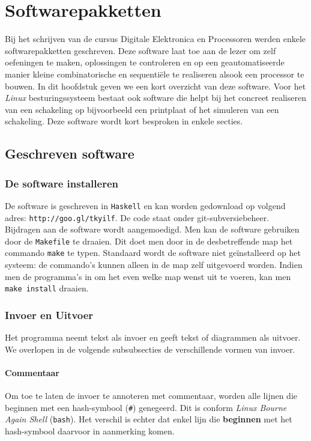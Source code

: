 \chapter{Softwarepakketten}
\begin{chapterintro}
Bij het schrijven van de cursus Digitale Elektronica en Processoren werden enkele softwarepakketten geschreven. Deze software laat toe aan de lezer om zelf oefeningen te maken, oplossingen te controleren en op een geautomatiseerde manier kleine combinatorische en sequenti\"ele te realiseren alsook een processor te bouwen. In dit hoofdstuk geven we een kort overzicht van deze software. Voor het \emph{Linux} besturingssysteem bestaat ook software die helpt bij het concreet realiseren van een schakeling op bijvoorbeeld een printplaat of het simuleren van een schakeling. Deze software wordt kort besproken in enkele secties.
\end{chapterintro}
\minitoc[n]
\section{Geschreven software}
\subsection{De software installeren}
De software is geschreven in \texttt{Haskell} en kan worden gedownload op volgend adres: \texttt{http://goo.gl/tkyilf}. De code staat onder git-subversiebeheer. Bijdragen aan de software wordt aangemoedigd. Men kan de software gebruiken door de \texttt{Makefile} te draaien. Dit doet men door in de desbetreffende map het commando \texttt{make} te typen. Standaard wordt de software niet ge\"installeerd op het systeem: de commando's kunnen alleen in de map zelf uitgevoerd worden. Indien men de programma's in om het even welke map wenst uit te voeren, kan men \texttt{make install} draaien.
\subsection{Invoer en Uitvoer}
Het programma neemt tekst als invoer en geeft tekst of diagrammen als uitvoer. We overlopen in de volgende subsubsecties de verschillende vormen van invoer.
\subsubsection{Commentaar}
Om toe te laten de invoer te annoteren met commentaar, worden alle lijnen die beginnen met een hash-symbool (\verb+#+) genegeerd. Dit is conform \emph{Linux Bourne Again Shell} (\texttt{bash}). Het verschil is echter dat enkel lijn die \textbf{beginnen} met het hash-symbool daarvoor in aanmerking komen.
